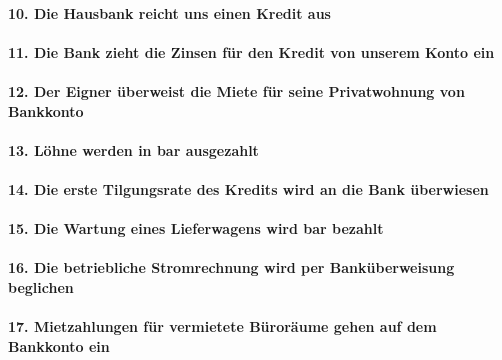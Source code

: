 \documentclass[paper=a4, fontsize=11pt]{scrartcl}
\numberwithin{equation}{section}
\numberwithin{figure}{section}
\numberwithin{table}{section}
\begin{document}
\paragraph{10. Die Hausbank reicht uns einen Kredit aus}

\paragraph{11. Die Bank zieht die Zinsen für den Kredit von unserem Konto ein}

\paragraph{12. Der Eigner überweist die Miete für seine Privatwohnung von Bankkonto}

\paragraph{13. Löhne werden in bar ausgezahlt}

\paragraph{14. Die erste Tilgungsrate des Kredits wird an die Bank überwiesen}

\paragraph{15. Die Wartung eines Lieferwagens wird bar bezahlt}

\paragraph{16. Die betriebliche Stromrechnung wird per Banküberweisung beglichen}

\paragraph{17. Mietzahlungen für vermietete Büroräume gehen auf dem Bankkonto ein}
\end{document}
